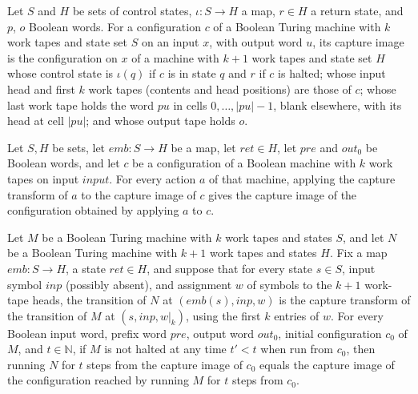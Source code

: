 \begin{definition}
\label{Turing.captureCfg}
\leanok
{}
Let $S$ and $H$ be sets of control states, $\iota : S \to H$ a map, $r \in H$ a return
state, and $p$, $o$ Boolean words. For a configuration $c$ of a Boolean Turing machine
with $k$ work tapes and state set $S$ on an input $x$, with output word $u$, its capture
image is the configuration on $x$ of a machine with $k+1$ work tapes and state set $H$
whose control state is $\iota(q)$ if $c$ is in state $q$ and $r$ if $c$ is halted; whose
input head and first $k$ work tapes (contents and head positions) are those of $c$; whose
last work tape holds the word $pu$ in cells $0, \dots, |pu|-1$, blank elsewhere, with its
head at cell $|pu|$; and whose output tape holds $o$.
\end{definition}

\begin{lemma}
\label{Turing.capture_apply}
\leanok
{}
Let $S,H$ be sets, let $emb:S\to H$ be a map, let $ret\in H$, let $pre$ and $out_0$ be
Boolean words, and let $c$ be a configuration of a Boolean machine with $k$ work tapes
on input $input$. For every action $a$ of that machine, applying the capture transform
of $a$ to the capture image of $c$ gives the capture image of the configuration obtained
by applying $a$ to $c$.
\end{lemma}

\begin{theorem}
\label{Turing.capture_run}
\leanok
{}
Let $M$ be a Boolean Turing machine with $k$ work tapes and states $S$, and let $N$ be a
Boolean Turing machine with $k+1$ work tapes and states $H$. Fix a map $emb:S\to H$, a
state $ret\in H$, and suppose that for every state $s\in S$, input symbol $inp$
(possibly absent), and assignment $w$ of symbols to the $k+1$ work-tape heads, the
transition of $N$ at $(emb(s),inp,w)$ is the capture transform of the transition of $M$
at $(s,inp,w|_{k})$, using the first $k$ entries of $w$. For every Boolean input word,
prefix word $pre$, output word $out_0$, initial configuration $c_0$ of $M$, and
$t\in\mathbb N$, if $M$ is not halted at any time $t'<t$ when run from $c_0$, then
running $N$ for $t$ steps from the capture image of $c_0$ equals the capture image of
the configuration reached by running $M$ for $t$ steps from $c_0$.
\end{theorem}

